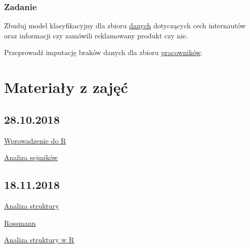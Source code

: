 \documentclass[]{book}
\begin{document}
\subsection{Zadanie}\label{zadanie-4}

Zbuduj model klasyfikacyjny dla zbioru
\href{data/Social_Network_Ads.csv}{danych} dotyczących cech internautów
oraz informacji czy zamówili reklamowany produkt czy nie.

Przeprowadź imputację braków danych dla zbioru
\href{data/pracownicy.RData}{pracowników}.

\chapter{Materiały z zajęć}\label{materiay-z-zajec}

\section{28.10.2018}\label{section}

\href{res/skrypt20181028.R}{Wprowadzenie do R}

\href{res/analiza20181028.R}{Analiza sejmików}

\section{18.11.2018}\label{section-1}

\href{https://departmentofstatisticspue.github.io/statystyka-opisowa/analiza-struktury.html}{Analiza
struktury}

\href{data/rossmann.xlsx}{Rossmann}

\href{res/zajecia20181118.R}{Analiza struktury w R}
\end{document}
